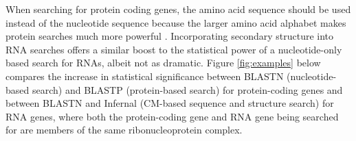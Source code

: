 \documentclass[custom,landscape,final,30pt,plainboxedsections]{sciposter-titleskipsmall}
\begin{document}
\begin{multicols}{3}
When searching for protein coding genes, the amino acid sequence
should be used instead of the nucleotide sequence because the larger
amino acid alphabet makes protein searches much more powerful
\cite{Pearson96}.  Incorporating secondary structure into RNA searches
offers a similar boost to the statistical power of a nucleotide-only
based search for RNAs, albeit not as dramatic. Figure
\ref{fig:examples} below compares the increase in statistical
significance between BLASTN (nucleotide-based search) and BLASTP
(protein-based search) for protein-coding genes and between BLASTN
and Infernal (CM-based sequence and structure search) for RNA genes,
where both the protein-coding gene and RNA gene being searched for are
members of the same ribonucleoprotein complex.

\setcounter{figure}{1}


\end{multicols}
\end{document}
